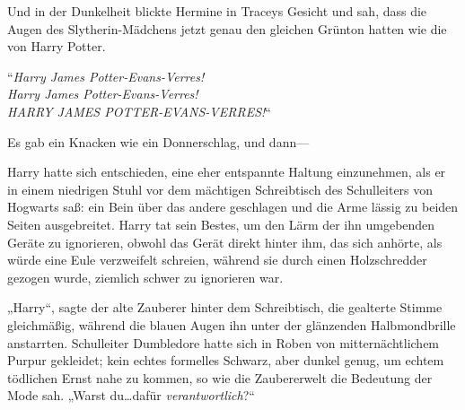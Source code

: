 Und in der Dunkelheit blickte Hermine in Traceys Gesicht und sah, dass die Augen des Slytherin-Mädchens jetzt genau den gleichen Grünton hatten wie die von Harry Potter.

“\emph{Harry James Potter-Evans-Verres!\\
Harry James Potter-Evans-Verres!\\
HARRY JAMES POTTER-EVANS-VERRES!}“

Es gab ein Knacken wie ein Donnerschlag, und dann—

\later

Harry hatte sich entschieden, eine eher entspannte Haltung einzunehmen, als er in einem niedrigen Stuhl vor dem mächtigen Schreibtisch des Schulleiters von Hogwarts saß: ein Bein über das andere geschlagen und die Arme lässig zu beiden Seiten ausgebreitet. Harry tat sein Bestes, um den Lärm der ihn umgebenden Geräte zu ignorieren, obwohl das Gerät direkt hinter ihm, das sich anhörte, als würde eine Eule verzweifelt schreien, während sie durch einen Holzschredder gezogen wurde, ziemlich schwer zu ignorieren war.

„Harry“, sagte der alte Zauberer hinter dem Schreibtisch, die gealterte Stimme gleichmäßig, während die blauen Augen ihn unter der glänzenden Halbmondbrille anstarrten. Schulleiter Dumbledore hatte sich in Roben von mitternächtlichem Purpur gekleidet; kein echtes formelles Schwarz, aber dunkel genug, um echtem tödlichen Ernst nahe zu kommen, so wie die Zaubererwelt die Bedeutung der Mode sah. „Warst du…dafür \emph{verantwortlich}?“

